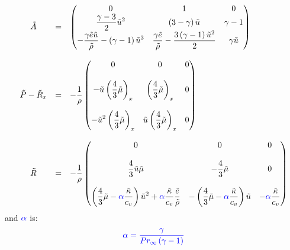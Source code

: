 \documentclass[11pt, a4paper]{article}
\begin{document}
\begin{equation}
    \begin{array}{ccl}
        \tilde{A} & = & \begin{pmatrix}
            0 & 1 & 0 \\
            \displaystyle\frac{\gamma-3}{2}\tilde{u}^2 & \left(3-\gamma\right)\tilde{u} & \gamma-1 \\
            \displaystyle-\frac{\gamma\tilde{e}\tilde{u}}{\tilde{\rho}}-\left(\gamma-1\right)\tilde{u}^3 & \displaystyle\frac{\gamma\tilde{e}}{\tilde{\rho}}-\frac{3\left(\gamma-1\right)\tilde{u}^2}{2} & \gamma\tilde{u}
        \end{pmatrix} \\\\
        \tilde{P}-\tilde{R}_x & = & \displaystyle-\frac{1}{\rho}\begin{pmatrix}
            0 & 0 & 0 \\\\
            \displaystyle-\tilde{u}\left(\frac{4}{3}\tilde{\mu}\right)_x & \displaystyle\left(\frac{4}{3}\tilde{\mu}\right)_x & 0 \\\\
            \displaystyle-\tilde{u}^2\left(\frac{4}{3}\tilde{\mu}\right)_x & \displaystyle\tilde{u}\left(\frac{4}{3}\tilde{\mu}\right)_x & 0
        \end{pmatrix} \\\\
        \tilde{R} & = & \displaystyle-\frac{1}{\rho}\begin{pmatrix}
            0 & 0 & 0 \\\\
            \displaystyle\frac{4}{3}\tilde{u}\tilde{\mu} & \displaystyle-\frac{4}{3}\tilde{\mu} & 0 \\\\
            \displaystyle\left(\frac{4}{3}\tilde{\mu}-\textcolor{blue}{\alpha}\frac{\tilde{\kappa}}{c_v}\right)\tilde{u}^2+\textcolor{blue}{\alpha}\frac{\tilde{\kappa}}{c_v}\frac{\tilde{e}}{\tilde{\rho}} & \displaystyle-\left(\frac{4}{3}\tilde{\mu}-\textcolor{blue}{\alpha}\frac{\tilde{\kappa}}{c_v}\right)\tilde{u} & \displaystyle-\textcolor{blue}{\alpha}\frac{\tilde{\kappa}}{c_v}
        \end{pmatrix}
    \end{array}
    \label{eq: A P R}
\end{equation}
and $\textcolor{blue}{\alpha}$ is: $$\textcolor{blue}{\alpha=\frac{\gamma}{Pr_\infty\left(\gamma-1\right)}}$$
\end{document}
